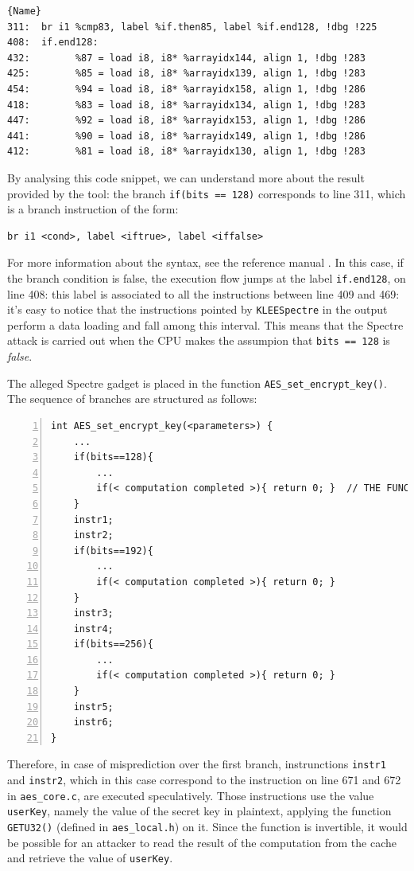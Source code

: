 \documentclass[12pt,a4paper]{book}
\theoremstyle{definition}
\begin{document}
	\lstset{numbers=none}
	\begin{lstlisting}[caption=\texttt{assembly.ll} (for AES-CBC), label=asm1]{Name}
311:  br i1 %cmp83, label %if.then85, label %if.end128, !dbg !225
408:  if.end128:                                        
432:  		%87 = load i8, i8* %arrayidx144, align 1, !dbg !283
425:  		%85 = load i8, i8* %arrayidx139, align 1, !dbg !283
454:  		%94 = load i8, i8* %arrayidx158, align 1, !dbg !286
418:  		%83 = load i8, i8* %arrayidx134, align 1, !dbg !283
447:  		%92 = load i8, i8* %arrayidx153, align 1, !dbg !286
441:  		%90 = load i8, i8* %arrayidx149, align 1, !dbg !286
412:  		%81 = load i8, i8* %arrayidx130, align 1, !dbg !283
	\end{lstlisting}
	\vspace{3mm}
	
	By analysing this code snippet, we can understand more about the result provided by the tool: the branch \texttt{if(bits == 128)} corresponds to line 311, which is a branch instruction of the form:
	
	\begin{lstlisting}[frame=none]
	br i1 <cond>, label <iftrue>, label <iffalse>
	\end{lstlisting}

	For more information about the syntax, see the reference manual \cite{LLVMasm}. In this case, if the branch condition is false, the execution flow jumps at the label \texttt{if.end128}, on line 408: this label is associated to all the instructions between line 409 and 469: it's easy to notice that the instructions pointed by \texttt{KLEESpectre} in the output perform a data loading and fall among this interval. This means that the Spectre attack is carried out when the CPU makes the assumpion that \texttt{bits == 128} is \textit{false}. 
	
	The alleged Spectre gadget is placed in the function \texttt{AES\_set\_encrypt\_key()}. The sequence of branches are structured as follows:
	
	\begin{lstlisting}[numbers=left]
int AES_set_encrypt_key(<parameters>) {
	...
	if(bits==128){
		...
		if(< computation completed >){ return 0; }	// THE FUNCTION RETURNS
	}
	instr1;
	instr2;
	if(bits==192){
		...
		if(< computation completed >){ return 0; }
	}
	instr3;
	instr4;
	if(bits==256){
		...
		if(< computation completed >){ return 0; }
	}
	instr5;
	instr6;
}
	\end{lstlisting}
	
	Therefore, in case of misprediction over the first branch, instrunctions \texttt{instr1} and \texttt{instr2}, which in this case correspond to the instruction on line 671 and 672 in \texttt{aes\_core.c}, are executed speculatively. Those instructions use the value \texttt{userKey}, namely the value of the secret key in plaintext, applying the function \texttt{GETU32()} (defined in \texttt{aes\_local.h}) on it. Since the function is invertible, it would be possible for an attacker to read the result of the computation from the cache and retrieve the value of \texttt{userKey}.
\end{document}
